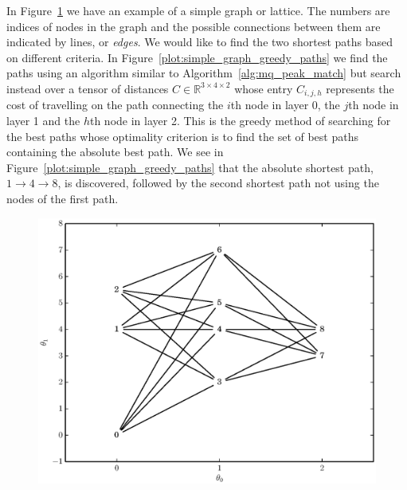 In Figure~\ref{plot:simple_graph} we have an example of a simple graph or
lattice. The numbers are indices of nodes in the graph and the possible
connections between them are indicated by lines, or \textit{edges}. We would
like to find the two shortest paths based on different criteria. In
Figure~\ref{plot:simple_graph_greedy_paths} we find the paths using an algorithm
similar to Algorithm~\ref{alg:mq_peak_match} but search instead over a tensor of
distances $C \in \mathbb{R}^{3 \times 4 \times 2}$ whose entry $C_{i,j,h}$
represents the cost of travelling on the path connecting the $i$th node in layer
0, the $j$th node in layer 1 and the $h$th node in layer 2. This is the greedy
method of searching for the best paths whose optimality criterion is to find the
set of best paths containing the absolute best path. We see in
Figure~\ref{plot:simple_graph_greedy_paths} that the absolute shortest path, $1
\rightarrow 4 \rightarrow 8$, is discovered, followed by the second shortest
path not using the nodes of the first path.

\begin{figure}[!t]
    \caption{\label{plot:simple_graph}}
    \centering
    \includegraphics[width=\figwidthscale\textwidth]{plots/small_graph_ex.eps}
    \CaptionWithTitle{%
    }{}
\end{figure}

